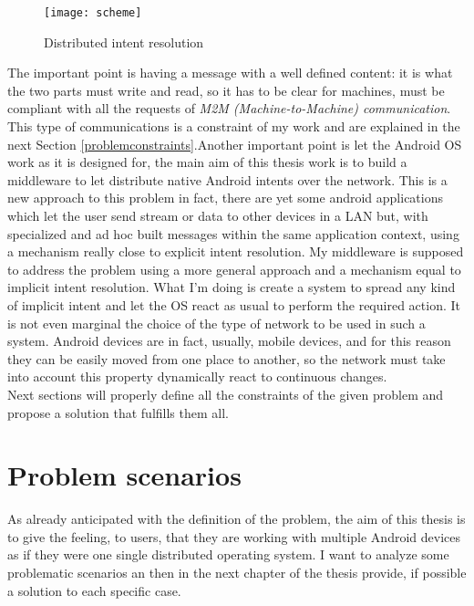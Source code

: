 \begin{figure}[h]
	\centering
	\texttt{[image: scheme]}
	\caption{Distributed intent resolution}
	\label{fig:3.1}
\end{figure}
The important point is having a message with a well defined content: it is what the two parts must write and read, so it has to be clear for machines, must be compliant with all the requests of \textit{M2M (Machine-to-Machine) communication}. This type of communications is a constraint of my work and are explained in the next Section \ref{problemconstraints}.Another important point is let the Android OS work as it is designed for, the main aim of this thesis work is to build a middleware to let distribute native Android intents over the network. This is a new approach to this problem in fact, there are yet some android applications which let the user send stream or data to other devices in a LAN but, with specialized and ad hoc built messages within the same application context, using a mechanism really close to explicit intent resolution. My middleware is supposed to address the problem using a more general approach and a mechanism equal to implicit intent resolution. What I'm doing is create a system to spread any kind of implicit intent and let the OS react as usual to perform the required action.
It is not even marginal the choice of the type of network to be used in such a system. Android devices are in fact, usually, mobile devices, and for this reason they can be easily moved from one place to another, so the network must take into account this property dynamically react to continuous changes.\\
Next sections will properly define all the constraints of the given problem and propose a solution that fulfills them all.
\section{Problem scenarios}
As already anticipated with the definition of the problem,  the aim of this thesis is to give the feeling, to users, that they are working with multiple Android devices as if they were one single distributed operating system. I want to analyze some problematic scenarios an then in the next chapter of the thesis provide, if possible a solution to each specific case.


